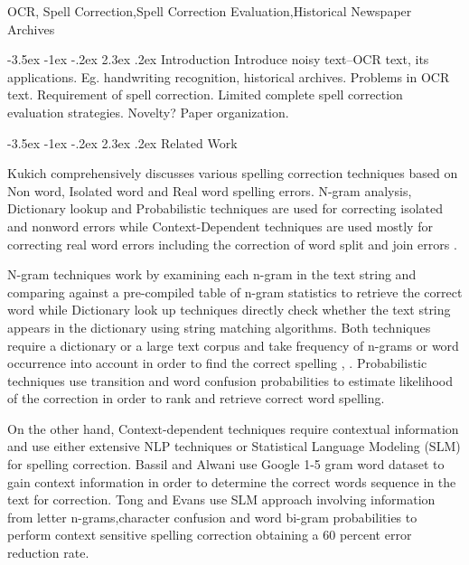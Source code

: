 \documentclass[12pt]{article}
\makeatletter
\renewcommand\section{\@startsection{section}{1}{\z@}%
                                  {-3.5ex \@plus -1ex \@minus -.2ex}%
                                  {2.3ex \@plus.2ex}%
                                  {\normalfont\bfseries}}
\makeatother
\begin{document}
 OCR, Spell Correction,Spell Correction Evaluation,Historical Newspaper Archives

\section{Introduction}
Introduce noisy text--OCR text, its applications. Eg. handwriting recognition, historical archives.
Problems in OCR text. Requirement of spell correction. Limited complete spell correction evaluation strategies. Novelty?
Paper organization.


\section{Related Work}
\label{spell:rw}

Kukich\cite{kukich1992techniques} comprehensively discusses various spelling correction techniques based on Non word, Isolated word and Real word spelling errors. N-gram analysis, Dictionary lookup and Probabilistic techniques are used for correcting isolated and nonword errors while Context-Dependent techniques are used mostly for correcting real word errors including the correction of word split and join errors \cite{elmi1998spelling}.

 N-gram techniques work by examining each n-gram in the text string and comparing against a pre-compiled table of n-gram statistics to retrieve the correct word while Dictionary look up techniques directly check whether the text string appears in the dictionary using string matching algorithms. Both techniques require a dictionary or a large text corpus and take frequency of n-grams or word occurrence into account in order to find the correct spelling \cite{strohmaier2003lexical}, \cite{ringlstetter2007text}.
 Probabilistic techniques use transition and word confusion probabilities to estimate likelihood of the correction in order to rank and retrieve correct word spelling.

On the other hand, Context-dependent techniques require contextual information and use either extensive NLP techniques or Statistical Language Modeling (SLM) for spelling correction.
Bassil and Alwani\cite{bassil2012ocr} use Google 1-5 gram word dataset to gain context information in order to determine the correct words sequence in the text for correction.
Tong and Evans\cite{tong1996statistical} use SLM approach involving information from letter n-grams,character confusion and word bi-gram probabilities to perform context sensitive spelling correction obtaining a 60 percent error reduction rate. 
\end{document}
